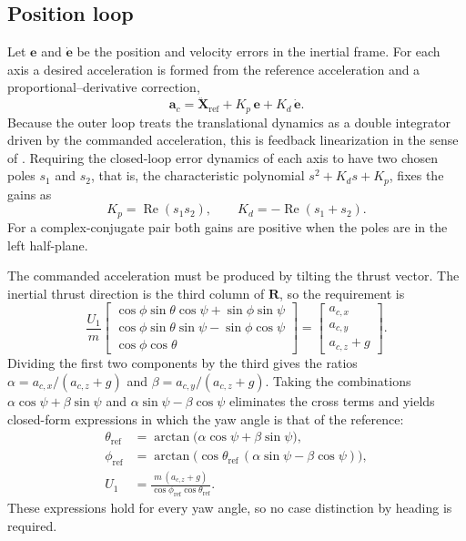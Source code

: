\documentclass[11pt,a4paper]{article}
\numberwithin{equation}{section}
\newcommand{\vect}[1]{\mathbf{#1}}
\begin{document}
\subsection{Position loop}

Let $\vect{e}$ and $\dot{\vect{e}}$ be the position and velocity errors in the inertial frame. For each axis a desired acceleration is formed from the reference acceleration and a proportional--derivative correction,
\begin{equation}
\vect{a}_c=\ddot{\vect{X}}_{\mathrm{ref}}+K_p\,\vect{e}+K_d\,\dot{\vect{e}} .
\end{equation}
Because the outer loop treats the translational dynamics as a double integrator driven by the commanded acceleration, this is feedback linearization in the sense of \cite{slotine1991}. Requiring the closed-loop error dynamics of each axis to have two chosen poles $s_1$ and $s_2$, that is, the characteristic polynomial $s^2+K_d s+K_p$, fixes the gains as
\begin{equation}
\boxed{K_p=\operatorname{Re}(s_1 s_2),\qquad K_d=-\operatorname{Re}(s_1+s_2).}
\end{equation}
For a complex-conjugate pair both gains are positive when the poles are in the left half-plane.

The commanded acceleration must be produced by tilting the thrust vector. The inertial thrust direction is the third column of $\vect{R}$, so the requirement is
\begin{equation}
\frac{U_1}{m}\begin{bmatrix}
\cos\phi\sin\theta\cos\psi+\sin\phi\sin\psi\\
\cos\phi\sin\theta\sin\psi-\sin\phi\cos\psi\\
\cos\phi\cos\theta
\end{bmatrix}=
\begin{bmatrix}a_{c,x}\\a_{c,y}\\a_{c,z}+g\end{bmatrix}.
\end{equation}
Dividing the first two components by the third gives the ratios $\alpha=a_{c,x}/(a_{c,z}+g)$ and $\beta=a_{c,y}/(a_{c,z}+g)$. Taking the combinations $\alpha\cos\psi+\beta\sin\psi$ and $\alpha\sin\psi-\beta\cos\psi$ eliminates the cross terms and yields closed-form expressions in which the yaw angle is that of the reference:
\begin{equation}
\boxed{
\begin{aligned}
\theta_{\mathrm{ref}}&=\arctan\!\big(\alpha\cos\psi+\beta\sin\psi\big),\\
\phi_{\mathrm{ref}}&=\arctan\!\big(\cos\theta_{\mathrm{ref}}\,(\alpha\sin\psi-\beta\cos\psi)\big),\\
U_1&=\frac{m\,(a_{c,z}+g)}{\cos\phi_{\mathrm{ref}}\cos\theta_{\mathrm{ref}}}.
\end{aligned}}
\end{equation}
These expressions hold for every yaw angle, so no case distinction by heading is required.
\end{document}
